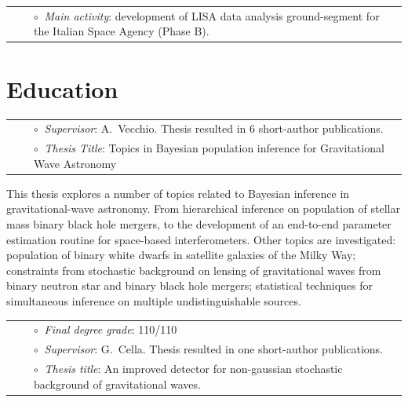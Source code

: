 \vspace{-0.1cm}
\begin{tabular}{rcl}
&\hspace{0.4cm} &$\circ\;\;${\textit{Main activity}}: development of LISA data analysis ground-segment for the Italian Space Agency (Phase B).
\end{tabular}


\section{Education}

\vspace{-0.1cm}
\begin{tabular}{rcl}
&\hspace{0.4cm} &$\circ\;\;${\textit{Supervisor}}: A.~Vecchio. Thesis resulted in 6 short-author publications.
\\
&\hspace{0.4cm} &$\circ\;\;${\textit{Thesis Title}}:
Topics in Bayesian population inference for Gravitational Wave Astronomy
\end{tabular}
\vspace{0.2cm}

{\small This thesis explores a number of topics related to Bayesian inference in gravitational-wave astronomy. From hierarchical inference on population of stellar mass binary black hole mergers, to the development of an end-to-end parameter estimation routine for space-based interferometers. Other topics are investigated: population of binary white dwarfs in satellite galaxies of the Milky Way; constraints from stochastic background on lensing of gravitational waves from binary neutron star and binary black hole mergers; statistical techniques for simultaneous inference on multiple undistinguishable sources.}

\vspace{0.2cm}
\vspace{-0.1cm}
\begin{tabular}{rcl}
&\hspace{0.4cm} &$\circ\;\;${\textit{Final degree grade}}: 110/110\\
&\hspace{0.4cm} &$\circ\;\;${\textit{Supervisor}}: G.~Cella. Thesis resulted in one short-author publications.\\
&\hspace{0.4cm} &$\circ\;\;${\textit{Thesis title}}: An improved detector for non-gaussian stochastic background of gravitational waves.
\end{tabular}
\vspace{0.2cm}

